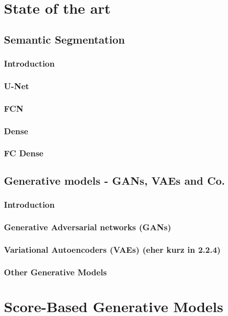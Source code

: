 \documentclass[a4paper, 12pt, oneside]{scrbook}
\begin{document}
\chapter{State of the art}
\section{Semantic Segmentation} %
\subsection{Introduction}
\subsection{U-Net} %
\subsection{FCN}
\subsection{Dense}
\subsection{FC Dense} 
\section{Generative models - GANs, VAEs and Co.} %
\subsection{Introduction}
\subsection{Generative Adversarial networks (GANs)} %
\subsection{Variational Autoencoders (VAEs) (eher kurz in 2.2.4)} %
\subsection{Other Generative Models} %

\chapter{Score-Based Generative Models} %

\end{document}
